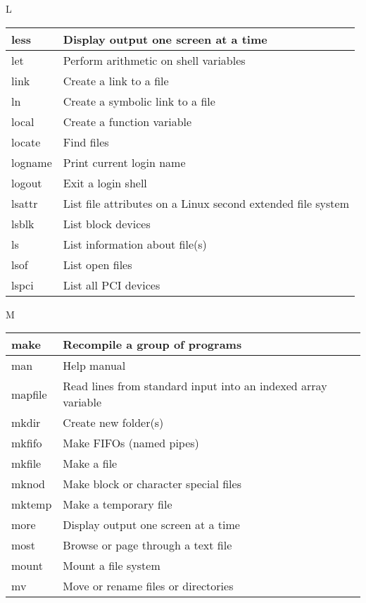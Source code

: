 \begin{flushleft}
\begin{tcolorbox}
	\textsc{L}
\end{tcolorbox}

\begin{tabular}{lp{12cm}}
	\hline
	less &	Display output one screen at a time \\
	\hline
	let &	Perform arithmetic on shell variables  \\
	\hline
	link &	Create a link to a file \\
	\hline
	ln &	Create a symbolic link to a file \\
	\hline
	local &	Create a function variable \\
	\hline
	locate &	Find files \\
	\hline
	logname &	Print current login name \\
	\hline
	logout &	Exit a login shell \\
	\hline
	lsattr &	List file attributes on a Linux second extended file system \\
	\hline
	lsblk &	List block devices \\
	\hline
	ls &	List information about file(s) \\
	\hline
	lsof &	List open files \\
	\hline
	lspci &	List all PCI devices \\
	\hline
\end{tabular}

\newpage

\begin{tcolorbox}
	\textsc{M}
\end{tcolorbox}

\begin{tabular}{lp{12cm}}
	\hline
 	make &	Recompile a group of programs \\
 	\hline
	man	 & Help manual \\
	\hline
	mapfile &	Read lines from standard input into an indexed array variable \\
	\hline
	mkdir &	Create new folder(s) \\
	\hline
	mkfifo &	Make FIFOs (named pipes) \\
	\hline
	mkfile &	Make a file \\
	\hline
	mknod &	Make block or character special files \\
	\hline
	mktemp &	Make a temporary file \\
	\hline
	more &	Display output one screen at a time \\
	\hline
	most &	Browse or page through a text file \\
	\hline
	mount &	Mount a file system \\
	\hline
	mv &	Move or rename files or directories \\
	\hline
\end{tabular}








\end{flushleft}
